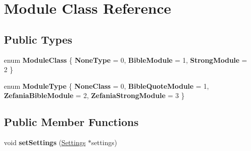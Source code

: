 \hypertarget{classModule}{
\section{Module Class Reference}
\label{classModule}
}
\subsection*{Public Types}
\begin{DoxyCompactItemize}
\item 
enum {\bfseries ModuleClass} \{ {\bfseries NoneType} =  0, 
{\bfseries BibleModule} =  1, 
{\bfseries StrongModule} =  2
 \}
\item 
enum {\bfseries ModuleType} \{ {\bfseries NoneClass} =  0, 
{\bfseries BibleQuoteModule} =  1, 
{\bfseries ZefaniaBibleModule} =  2, 
{\bfseries ZefaniaStrongModule} =  3
 \}
\end{DoxyCompactItemize}
\subsection*{Public Member Functions}
\begin{DoxyCompactItemize}
\item 
\hypertarget{classModule_a5e32e32434ff5dbe47c3c888268f751a}{
void {\bfseries setSettings} (\hyperlink{classSettings}{Settings} $\ast$settings)}
\label{classModule_a5e32e32434ff5dbe47c3c888268f751a}

\end{DoxyCompactItemize}
